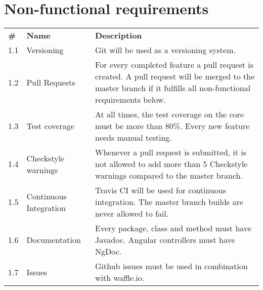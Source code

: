 \documentclass{scrreprt}
\begin{document}
\chapter*{Non-functional requirements}

\begin{table}[h]
\begin{tabular}{|p{0.5cm}|p{3.5cm}|p{13.4cm}|}
\textbf{\#} & \textbf{Name} & \textbf{Description} \\
	  1.1 & Versioning & Git will be used as a versioning system.\\
	  1.2 & Pull Requests & For every completed feature a pull request is created. A pull request will be merged to the master branch if it fulfills all non-functional requirements below. \\
      1.3 & Test coverage & At all times, the test coverage on the core must be more than 80\%. Every new feature needs manual testing.\\
      1.4 & Checkstyle warnings & Whenever a pull request is submitted, it is not allowed to add more than 5 Checkstyle warnings compared to the master branch.\\
      1.5 & Continuous \newline Integration & Travis CI will be used for continuous integration. The master branch builds are never allowed to fail.\\
      1.6 & Documentation & Every package, class and method must have Javadoc. Angular controllers must have NgDoc.\\
      1.7 & Issues & Github issues must be used in combination with waffle.io.\\
\end{tabular}
\end{table}
\end{document}
